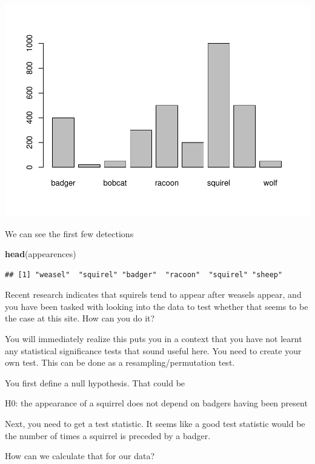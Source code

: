 \documentclass[
]{article}
\newenvironment{Shaded}{\begin{snugshade}}{\end{snugshade}}
\newcommand{\FunctionTok}[1]{\textcolor[rgb]{0.13,0.29,0.53}{\textbf{#1}}}
\newcommand{\NormalTok}[1]{#1}
\begin{document}
\includegraphics{TAMsIntro2RviaRStudioTutorial_files/figure-latex/unnamed-chunk-75-1.pdf}

We can see the first few detections

\begin{Shaded}
\begin{Highlighting}[]
\FunctionTok{head}\NormalTok{(appearences)}
\end{Highlighting}
\end{Shaded}

\begin{verbatim}
## [1] "weasel"  "squirel" "badger"  "racoon"  "squirel" "sheep"
\end{verbatim}

Recent research indicates that squirels tend to appear after weasels
appear, and you have been tasked with looking into the data to test
whether that seems to be the case at this site. How can you do it?

You will immediately realize this puts you in a context that you have
not learnt any statistical significance tests that sound useful here.
You need to create your own test. This can be done as a
resampling/permutation test.

You first define a null hypothesis. That could be

H0: the appearance of a squirrel does not depend on badgers having been
present

Next, you need to get a test statistic. It seems like a good test
statistic would be the number of times a squirrel is preceded by a
badger.

How can we calculate that for our data?
\end{document}
